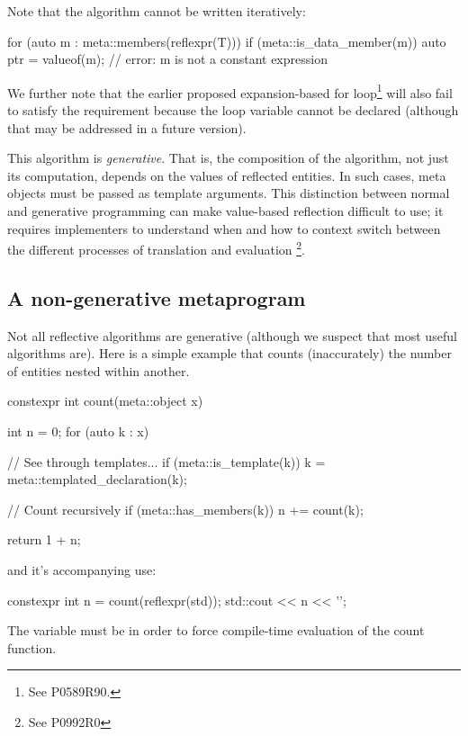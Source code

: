 Note that the algorithm cannot be written iteratively: 

\begin{codeblock}
for (auto m : meta::members(reflexpr(T))) { 
  if (meta::is_data_member(m)) 
    auto ptr = valueof(m); // error: m is not a constant expression 
}
\end{codeblock}

We further note that the earlier proposed expansion-based for loop\footnote{See P0589R90.} will also fail to satisfy the requirement because the loop variable cannot be declared  (although that may be addressed in a future version). 

This algorithm is \emph{generative}. 
That is, the composition of the algorithm, not just its computation, depends on the values of reflected entities. 
In such cases, meta objects must be passed as template arguments. 
This distinction between normal and generative programming can make value-based reflection difficult to use; it requires implementers to understand when and how to context switch between the different processes of translation and evaluation \footnote{See P0992R0}.


\subsection{A non-generative metaprogram}

Not all reflective algorithms are generative (although we suspect that most useful algorithms are). Here is a simple example that counts (inaccurately) the number of entities nested within another. 

\begin{codeblock}
constexpr int count(meta::object x) { 
  int n = 0; 
  for (auto k : x) { 
    // See through templates... 
    if (meta::is_template(k)) 
      k = meta::templated_declaration(k); 

    // Count recursively 
    if (meta::has_members(k)) 
      n += count(k); 
  } 
  return 1 + n; 
}
\end{codeblock}

and it’s accompanying use: 

\begin{codeblock}
constexpr int n = count(reflexpr(std)); 
std::cout << n << '\n'; 
\end{codeblock}

The variable  must be  in order to force compile-time evaluation of the count function. 

